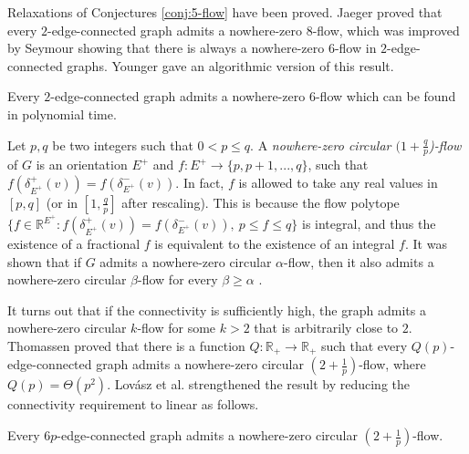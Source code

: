 \documentclass[runningheads]{llncs}
\newcommand{\R}{\mathbb{R}}
\begin{document}
Relaxations of Conjectures \ref{conj:5-flow} have been proved.
Jaeger \cite{jaeger1976nowhere,jaeger1979flows} proved that every $2$-edge-connected graph admits a nowhere-zero $8$-flow, which was improved by Seymour \cite{seymour1981nowhere} showing that there is always a nowhere-zero $6$-flow in $2$-edge-connected graphs. Younger \cite{younger1983integer} gave an algorithmic version of this result.


\begin{theorem}\label{thm:6-flow}
    Every $2$-edge-connected graph admits a nowhere-zero $6$-flow which can be found in polynomial time.
\end{theorem}

Let $p,q$ be two integers such that $0<p\leq q$. A \textit{nowhere-zero circular $(1+\frac{q}{p}$)-flow} of $G$ is an orientation $E^+$ and $f:E^+\rightarrow \{p,p+1,...,q\}$, such that $f(\delta_{E^+}^+(v))=f(\delta_{E^+}^-(v))$. 
In fact, $f$ is allowed to take any real values in $[p,q]$ (or in $[1,\frac{q}{p}]$ after rescaling). This is because the flow polytope $\big\{f\in \R^{E^+}:f(\delta_{E^+}^+(v))=f(\delta_{E^+}^-(v)),\ p\leq f\leq q\big\}$ is integral, and thus the existence of a fractional $f$ is equivalent to the existence of an integral $f$.
It was shown that if $G$ admits a nowhere-zero circular $\alpha$-flow, then it also admits a nowhere-zero circular $\beta$-flow for every $\beta\geq \alpha$ \cite{goddyn1998k}.

It turns out that if the connectivity is sufficiently high, the graph admits a nowhere-zero circular $k$-flow for some $k>2$ that is arbitrarily close to $2$. Thomassen \cite{thomassen2012weak} proved that there is a function $Q:\R_+\rightarrow \R_+$ such that every $Q(p)$-edge-connected graph admits a nowhere-zero circular $(2+\frac{1}{p})$-flow, where $Q(p)=\Theta(p^2)$. 
Lov\'asz et al. \cite{lovasz2013nowhere} strengthened the result by reducing the connectivity requirement to linear as follows.

\begin{theorem}\label{thm:6k-connected:circular flow}
    Every $6p$-edge-connected graph admits a nowhere-zero circular $(2+\frac{1}{p})$-flow.
\end{theorem}
\end{document}
